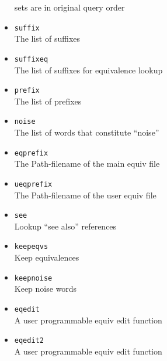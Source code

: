 \begin{itemize}
    sets are in original query order
  \item \verb`suffix` \\
    The list of suffixes
  \item \verb`suffixeq` \\
    The list of suffixes for equivalence lookup
  \item \verb`prefix` \\
    The list of prefixes
  \item \verb`noise` \\
    The list of words that constitute ``noise''
  \item \verb`eqprefix` \\
    The Path-filename of the main equiv file
  \item \verb`ueqprefix` \\
    The Path-filename of the user equiv file
  \item \verb`see` \\
    Lookup ``see also'' references
  \item \verb`keepeqvs` \\
    Keep equivalences
  \item \verb`keepnoise` \\
    Keep noise words
  \item \verb`eqedit` \\
    A user programmable equiv edit function
  \item \verb`eqedit2` \\
    A user programmable equiv edit function

\end{itemize}
